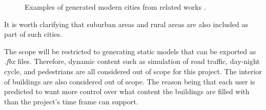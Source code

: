 \begin{figure}[h!]
  \centering

  \begin{subfigure}[b]{0.48\textwidth}
  \end{subfigure}
  \quad
  \begin{subfigure}[b]{0.48\textwidth}
  \end{subfigure}

  \caption{Examples of generated modern cities from related works \cite{yoav_and_pascal}\cite{cl3ver}.}
  \label{fig:ModernCities}
\end{figure}

It is worth clarifying that suburban areas and rural areas are also included as
part of such cities.

The scope will be restricted to generating static models that can be exported as \textit{.fbx} files.
Therefore, dynamic content such as simulation of road traffic, day-night cycle, and pedestrians are all considered out of scope for this project.
The interior of buildings are also considered out of scope.
The reason being that each user is predicted to want more control over what content the buildings are filled with than the project's time frame can support.

